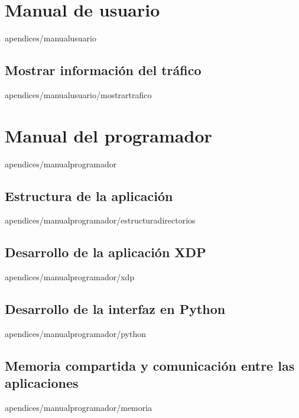 \documentclass[epsbased,copyright,final,printable,covers,extendedindex,firstnumbered,tfg,gnuplot]{tfgtfmthesisuam}
\begin{document}
\chapter{Manual de usuario\label{CAP: PROGRAMADOR}}{apendices/manualusuario}
    \section{Mostrar información del tráfico\label{SEC:MOSTRARTRAFICO}}{apendices/manualusuario/mostrartrafico}


\chapter{Manual del programador\label{CAP: PROGRAMADOR}}{apendices/manualprogramador}
    \section{Estructura de la aplicación\label{SEC:ESTRUCTURAAPlICACION}}{apendices/manualprogramador/estructuradirectorios}
    \section{Desarrollo de la aplicación XDP\label{SEC:ENTORNOC}}{apendices/manualprogramador/xdp}
    \section{Desarrollo de la interfaz en Python\label{SEC:ENTORNOPYTHON}}{apendices/manualprogramador/python}
    \section{Memoria compartida y comunicación entre las aplicaciones\label{SEC:ENTORNOPYTHON}}{apendices/manualprogramador/memoria}
\end{document}
